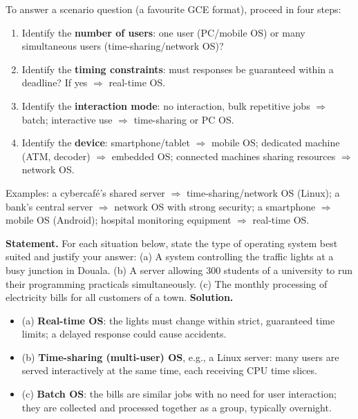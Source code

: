 \documentclass[11pt]{article}
\begin{document}
\begin{methode}
To answer a scenario question (a favourite GCE format), proceed in four steps:
\begin{enumerate}
\item Identify the \textbf{number of users}: one user (PC/mobile OS) or many simultaneous users (time-sharing/network OS)?
\item Identify the \textbf{timing constraints}: must responses be guaranteed within a deadline? If yes $\Rightarrow$ real-time OS.
\item Identify the \textbf{interaction mode}: no interaction, bulk repetitive jobs $\Rightarrow$ batch; interactive use $\Rightarrow$ time-sharing or PC OS.
\item Identify the \textbf{device}: smartphone/tablet $\Rightarrow$ mobile OS; dedicated machine (ATM, decoder) $\Rightarrow$ embedded OS; connected machines sharing resources $\Rightarrow$ network OS.
\end{enumerate}
Examples: a cybercafé's shared server $\Rightarrow$ time-sharing/network OS (Linux); a bank's central server $\Rightarrow$ network OS with strong security; a smartphone $\Rightarrow$ mobile OS (Android); hospital monitoring equipment $\Rightarrow$ real-time OS.
\end{methode}

\begin{exoresolu}
\textbf{Statement.} For each situation below, state the type of operating system best suited and justify your answer: (a) A system controlling the traffic lights at a busy junction in Douala. (b) A server allowing 300 students of a university to run their programming practicals simultaneously. (c) The monthly processing of electricity bills for all customers of a town. \tcblower
\textbf{Solution.}
\begin{itemize}
\item (a) \textbf{Real-time OS}: the lights must change within strict, guaranteed time limits; a delayed response could cause accidents.
\item (b) \textbf{Time-sharing (multi-user) OS}, e.g., a Linux server: many users are served interactively at the same time, each receiving CPU time slices.
\item (c) \textbf{Batch OS}: the bills are similar jobs with no need for user interaction; they are collected and processed together as a group, typically overnight.
\end{itemize}
\end{exoresolu}
\end{document}
